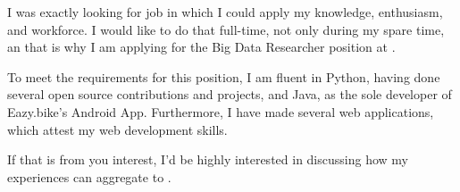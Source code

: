 
I was exactly looking for job in which I could apply my knowledge, enthusiasm, and workforce. I would like to do that full-time, not only during my spare time, an that is why I am applying for the Big Data Researcher position at \companyName. 



To meet the requirements for this position, I am fluent in Python, having done several open source contributions and projects, and Java, as the sole developer of Eazy.bike's Android App. Furthermore, I have made several web applications, which attest my web development skills.

If that is from you interest, I'd be highly interested in discussing how my experiences can aggregate to \companyName.





